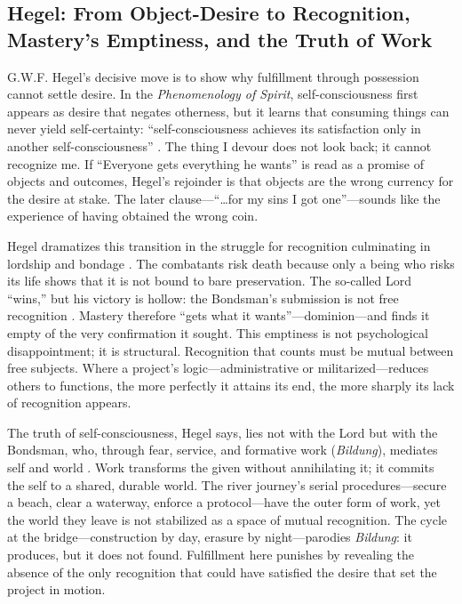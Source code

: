 \subsection*{Hegel: From Object-Desire to Recognition, Mastery's Emptiness, and the Truth of
	Work}
\label{ssec:iii-hegel}
G.W.F. Hegel's decisive move is to show why fulfillment through possession cannot settle
desire. In the \emph{Phenomenology of Spirit}, self-consciousness first appears as desire that
negates
otherness, but it learns that consuming things can never yield self-certainty:
``self-consciousness achieves its satisfaction only in another self-consciousness''
\parencite[\S 175]{HegelPhenomenology1977}. The thing I devour does not look back; it cannot
recognize me. If ``Everyone gets everything he wants'' is read as a promise of objects and
outcomes, Hegel's rejoinder is that objects are the wrong currency for the desire at stake.
The later clause—``\ldots for my sins I got one''—sounds like the experience of having obtained
the wrong coin.

Hegel dramatizes this transition in the struggle for recognition culminating in lordship and
bondage \parencite[\S\S 178--196]{HegelPhenomenology1977}. The combatants risk death because
only a being who risks its life shows that it is not bound to bare preservation. The so-called
Lord ``wins,'' but his victory is hollow: the Bondsman's submission is not free recognition
\parencite[\S\S 187--189]{HegelPhenomenology1977}. Mastery therefore ``gets what it
wants''—dominion—and
finds it empty of the very confirmation it sought. This emptiness is not psychological
disappointment; it is structural. Recognition that counts must be mutual between free subjects.
Where a project's logic—administrative or militarized—reduces others to functions, the more
perfectly it attains its end, the more sharply its lack of recognition appears.

The truth of self-consciousness, Hegel says, lies not with the Lord but with the Bondsman, who,
through fear, service, and formative work (\emph{Bildung}), mediates self and world
\parencite[\S 196]{HegelPhenomenology1977}. Work transforms the given without annihilating it;
it commits the self to a shared, durable world. The river journey's serial procedures—secure a
beach, clear a waterway, enforce a protocol—have the outer form of work, yet the world they
leave is not stabilized as a space of mutual recognition. The cycle at the bridge—construction
by day, erasure by night—parodies \emph{Bildung}: it produces, but it does not found.
Fulfillment here punishes by revealing the absence of the only recognition that could have
satisfied the desire that set the project in motion.

